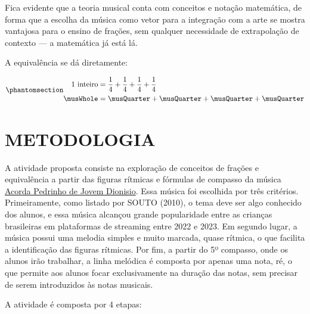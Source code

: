 \documentclass[
  letterpaper,
  DIV=11,
  numbers=noendperiod]{scrreprt}
\begin{document}
Fica evidente que a teoria musical conta com conceitos e notação
matemática, de forma que a escolha da música como vetor para a
integração com a arte se mostra vantajosa para o ensino de frações, sem
qualquer necessidade de extrapolação de contexto --- a matemática já
está lá.

A equivalência se dá diretamente:

\begin{equation}\phantomsection\label{eq-fracao}{
\begin{aligned}
  \text{1 inteiro} &= \frac{1}{4} + \frac{1}{4} + \frac{1}{4} + \frac{1}{4} \\
 \musWhole &= \musQuarter + \musQuarter + \musQuarter + \musQuarter
\end{aligned}
}\end{equation}

\chapter{METODOLOGIA}\label{metodologia}

A atividade proposta consiste na exploração de conceitos de frações e
equivalência a partir das figuras rítmicas e fórmulas de compasso da
música
\href{https://open.spotify.com/intl-pt/track/2sUhjzuc6w4SRFwoC3LvXZ?si=594a3325c9c24baa}{Acorda
Pedrinho de Jovem Dionisio}. Essa música foi escolhida por três
critérios. Primeiramente, como listado por SOUTO (2010), o tema deve ser
algo conhecido dos alunos, e essa música alcançou grande popularidade
entre as crianças brasileiras em plataformas de streaming entre 2022 e
2023. Em segundo lugar, a música possui uma melodia simples e muito
marcada, quase rítmica, o que facilita a identificação das figuras
rítmicas. Por fim, a partir do 5º compasso, onde os alunos irão
trabalhar, a linha melódica é composta por apenas uma nota, ré, o que
permite aos alunos focar exclusivamente na duração das notas, sem
precisar de serem introduzidos às notas musicais.

A atividade é composta por 4 etapas:
\end{document}

